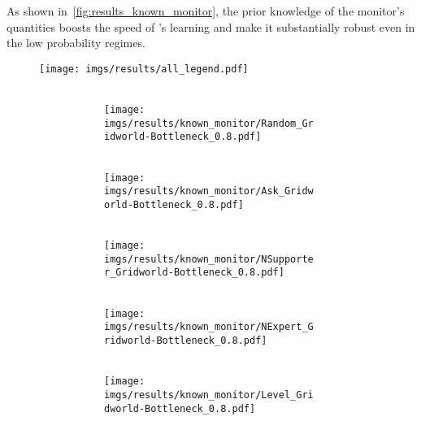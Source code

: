 As shown in~\cref{fig:results_known_monitor}, the prior knowledge of the monitor's quantities boosts the speed of \thealgo's learning and make it substantially robust even in the low probability regimes.
%
%
%
\begin{figure}[!tbh]
    \centering
    \texttt{[image: imgs/results/all\_legend.pdf]}
    \\[3pt]
    \begin{subfigure}{\linewidth}
    \hfill
    \begin{subfigure}[b]{0.158\linewidth}
        \centering
        \\
        \texttt{[image: imgs/results/known\_monitor/Random\_Gridworld-Bottleneck\_0.8.pdf]}
    \end{subfigure} 
    \hfill
        \begin{subfigure}[b]{0.158\linewidth}
        \centering
        \\
        \texttt{[image: imgs/results/known\_monitor/Ask\_Gridworld-Bottleneck\_0.8.pdf]}
    \end{subfigure} 
    \hfill
        \begin{subfigure}[b]{0.158\textwidth}
        \centering
        \\
        \texttt{[image: imgs/results/known\_monitor/NSupporter\_Gridworld-Bottleneck\_0.8.pdf]}
    \end{subfigure} 
    \hfill
    \begin{subfigure}[b]{0.158\textwidth}
        \centering
        \\
        \texttt{[image: imgs/results/known\_monitor/NExpert\_Gridworld-Bottleneck\_0.8.pdf]}
    \end{subfigure} 
    \hfill
    \begin{subfigure}[b]{0.158\textwidth}
        \centering
        \\
        \texttt{[image: imgs/results/known\_monitor/Level\_Gridworld-Bottleneck\_0.8.pdf]}

\end{subfigure}
\end{subfigure}
\end{figure}
